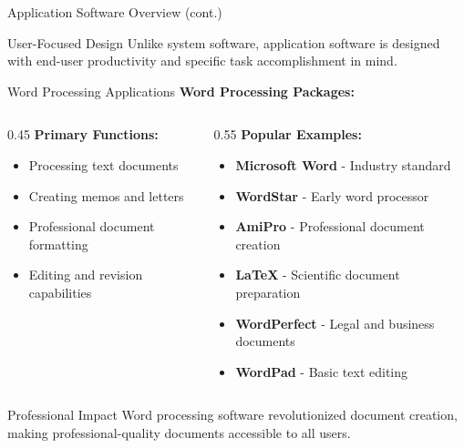 \documentclass[aspectratio=169]{beamer}
\begin{document}
\begin{frame}{Application Software Overview (cont.)}
    
        
    
    \begin{exampleblock}{User-Focused Design}
        Unlike system software, application software is designed with end-user productivity and specific task accomplishment in mind.
    \end{exampleblock}
\end{frame}

\begin{frame}{Word Processing Applications}
    \textbf{Word Processing Packages:}
    
    \begin{columns}
        \begin{column}{0.45\textwidth}
            \textbf{Primary Functions:}
            \begin{itemize}
                \item Processing text documents
                \item Creating memos and letters
                \item Professional document formatting
                \item Editing and revision capabilities
            \end{itemize}
            
           
        \end{column}
        \begin{column}{0.55\textwidth}
              \textbf{Popular Examples:}
            \begin{itemize}
                \item \textbf{Microsoft Word} - Industry standard
                \item \textbf{WordStar} - Early word processor
                \item \textbf{AmiPro} - Professional document creation
                \item \textbf{LaTeX} - Scientific document preparation
                \item \textbf{WordPerfect} - Legal and business documents
                \item \textbf{WordPad} - Basic text editing
            \end{itemize}
        \end{column}
    \end{columns}
    
    \begin{alertblock}{Professional Impact}
        Word processing software revolutionized document creation, making professional-quality documents accessible to all users.
    \end{alertblock}
\end{frame}
\end{document}
